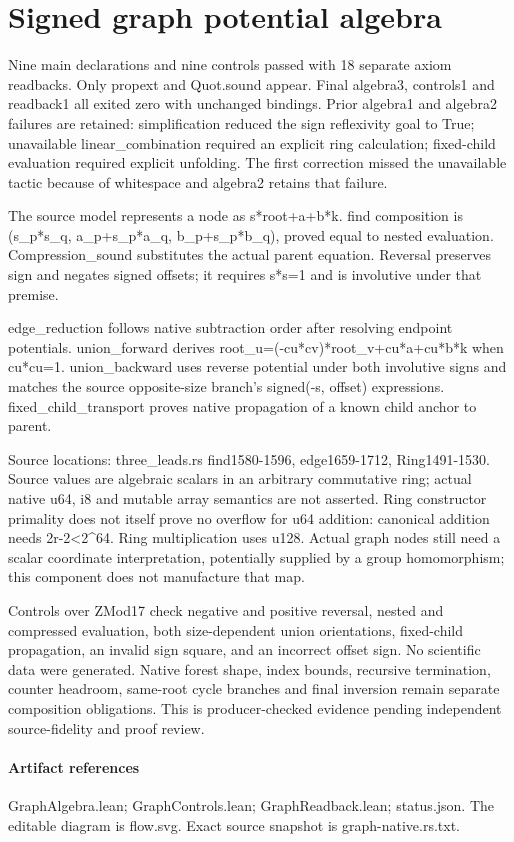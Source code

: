 \documentclass[11pt]{article}
\begin{document}
\sloppy
\section*{Signed graph potential algebra}
Nine main declarations and nine controls passed with 18 separate axiom readbacks. Only propext and Quot.sound appear. Final algebra3, controls1 and readback1 all exited zero with unchanged bindings. Prior algebra1 and algebra2 failures are retained: simplification reduced the sign reflexivity goal to True; unavailable linear\_combination required an explicit ring calculation; fixed-child evaluation required explicit unfolding. The first correction missed the unavailable tactic because of whitespace and algebra2 retains that failure.\par\medskip
The source model represents a node as s*root+a+b*k. find composition is (s\_p*s\_q, a\_p+s\_p*a\_q, b\_p+s\_p*b\_q), proved equal to nested evaluation. Compression\_sound substitutes the actual parent equation. Reversal preserves sign and negates signed offsets; it requires s*s=1 and is involutive under that premise.\par\medskip
edge\_reduction follows native subtraction order after resolving endpoint potentials. union\_forward derives root\_u=(-cu*cv)*root\_v+cu*a+cu*b*k when cu*cu=1. union\_backward uses reverse potential under both involutive signs and matches the source opposite-size branch's signed(-s, offset) expressions. fixed\_child\_transport proves native propagation of a known child anchor to parent.\par\medskip
Source locations: three\_leads.rs find1580-1596, edge1659-1712, Ring1491-1530. Source values are algebraic scalars in an arbitrary commutative ring; actual native u64, i8 and mutable array semantics are not asserted. Ring constructor primality does not itself prove no overflow for u64 addition: canonical addition needs 2r-2<2\textasciicircum{}64. Ring multiplication uses u128. Actual graph nodes still need a scalar coordinate interpretation, potentially supplied by a group homomorphism; this component does not manufacture that map.\par\medskip
Controls over ZMod17 check negative and positive reversal, nested and compressed evaluation, both size-dependent union orientations, fixed-child propagation, an invalid sign square, and an incorrect offset sign. No scientific data were generated. Native forest shape, index bounds, recursive termination, counter headroom, same-root cycle branches and final inversion remain separate composition obligations. This is producer-checked evidence pending independent source-fidelity and proof review.\par\medskip
\paragraph{Artifact references} GraphAlgebra.lean; GraphControls.lean; GraphReadback.lean; status.json. The editable diagram is flow.svg. Exact source snapshot is graph-native.rs.txt.
\end{document}
